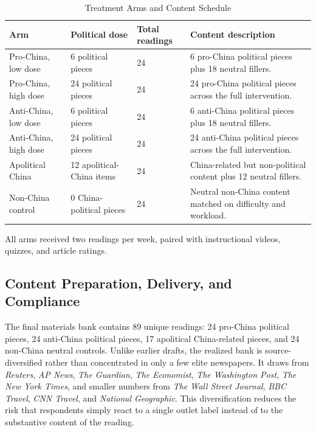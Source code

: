 \documentclass[12pt,american]{article}
\begin{document}
\begin{table}[H]
\centering
\caption{Treatment Arms and Content Schedule}
\label{tab:arms}
\begin{threeparttable}
\small
\begin{tabularx}{\textwidth}{L{0.25\textwidth}L{0.18\textwidth}L{0.15\textwidth}X}
\toprule
Arm & Political dose & Total readings & Content description \\
\midrule
Pro-China, low dose & 6 political pieces & 24 & 6 pro-China political pieces plus 18 neutral fillers. \\
Pro-China, high dose & 24 political pieces & 24 & 24 pro-China political pieces across the full intervention. \\
Anti-China, low dose & 6 political pieces & 24 & 6 anti-China political pieces plus 18 neutral fillers. \\
Anti-China, high dose & 24 political pieces & 24 & 24 anti-China political pieces across the full intervention. \\
Apolitical China & 12 apolitical-China items & 24 & China-related but non-political content plus 12 neutral fillers. \\
Non-China control & 0 China-political pieces & 24 & Neutral non-China content matched on difficulty and workload. \\
\bottomrule
\end{tabularx}
\begin{tablenotes}
\footnotesize
\item All arms received two readings per week, paired with instructional videos, quizzes, and article ratings.
\end{tablenotes}
\end{threeparttable}
\end{table}

\subsection{Content Preparation, Delivery, and Compliance}

The final materials bank contains 89 unique readings: 24 pro-China political pieces, 24 anti-China political pieces, 17 apolitical China-related pieces, and 24 non-China neutral controls. Unlike earlier drafts, the realized bank is source-diversified rather than concentrated in only a few elite newspapers. It draws from \emph{Reuters}, \emph{AP News}, \emph{The Guardian}, \emph{The Economist}, \emph{The Washington Post}, \emph{The New York Times}, and smaller numbers from \emph{The Wall Street Journal}, \emph{BBC Travel}, \emph{CNN Travel}, and \emph{National Geographic}. This diversification reduces the risk that respondents simply react to a single outlet label instead of to the substantive content of the reading.
\end{document}
